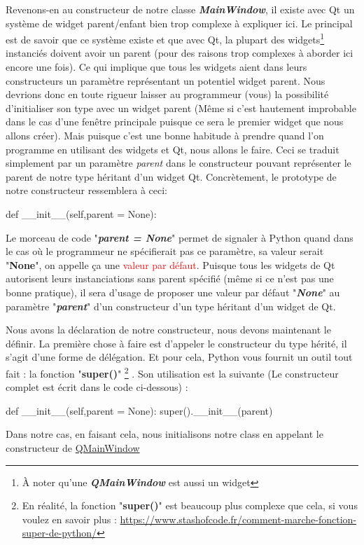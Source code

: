 \documentclass[12pt]{report}    %
\newcommand{\bold}[1]{{\bfseries #1}}
\newcommand{\italic}[1]{{\itshape #1}}
\newcommand{\ib}[1]{{\bfseries\itshape #1}}
\newcommand{\smallSkip}{\vskip 0.5cm}
\begin{document}
Revenons-en au constructeur de notre classe \ib{MainWindow}, il existe avec Qt un système de widget parent/enfant bien trop complexe à expliquer ici. Le principal est de savoir que ce système existe et que avec Qt, la plupart des widgets\footnote{À noter qu'une \ib{QMainWindow} est aussi un widget} instanciés doivent avoir un parent (pour des raisons trop complexes à aborder ici encore une fois). Ce qui implique que tous les widgets aient dans leurs constructeurs un paramètre représentant un potentiel widget parent.\vskip 0cm %
Nous devrions donc en toute rigueur laisser au programmeur (vous) la possibilité d'initialiser son type avec un widget parent (Même si c'est hautement improbable dans le cas d'une fenêtre principale puisque ce sera le premier widget que nous allons créer). Mais puisque c'est une bonne habitude à prendre quand l'on programme en utilisant des widgets et Qt, nous allons le faire.\newline
Ceci se traduit simplement par un paramètre \italic{parent} dans le constructeur pouvant représenter le parent de notre type héritant d'un widget Qt.\newline
Concrètement, le prototype de notre constructeur ressemblera à ceci:
\begin{pyCode}
def __init__(self,parent = None):
\end{pyCode}
Le morceau de code "\ib{parent = None}" permet de signaler à Python quand dans le cas où le programmeur ne spécifierait pas ce paramètre, sa valeur serait "\bold{None}", on appelle ça une \textcolor{red}{valeur par défaut}.\newline
Puisque tous les widgets de Qt autorisent leurs instanciations sans parent spécifié (même si ce n'est pas une bonne pratique), il sera d'usage de proposer une valeur par défaut "\ib{None}" au paramètre "\ib{parent}" d'un constructeur d'un type héritant d'un widget de Qt.\smallSkip

Nous avons la déclaration de notre constructeur, nous devons maintenant le définir.\newline
La première chose à faire est d'appeler le constructeur du type hérité, il s'agit d'une forme de délégation. Et pour cela, Python vous fournit un outil tout fait : la fonction "\bold{super()}"
\footnote
{
En réalité, la fonction "\bold{super()}" est beaucoup plus complexe que cela, si vous voulez en savoir plus : \url{https://www.stashofcode.fr/comment-marche-fonction-super-de-python/}
}
. Son utilisation est la suivante (Le constructeur complet est écrit dans le code ci-dessous) :
\begin{pyCode}
def __init__(self,parent = None):
		super().__init__(parent)
\end{pyCode}
Dans notre cas, en faisant cela, nous initialisons notre class en appelant le constructeur de \href{https://doc.qt.io/qt-5/qmainwindow.html}{QMainWindow}\newpage
\end{document}
